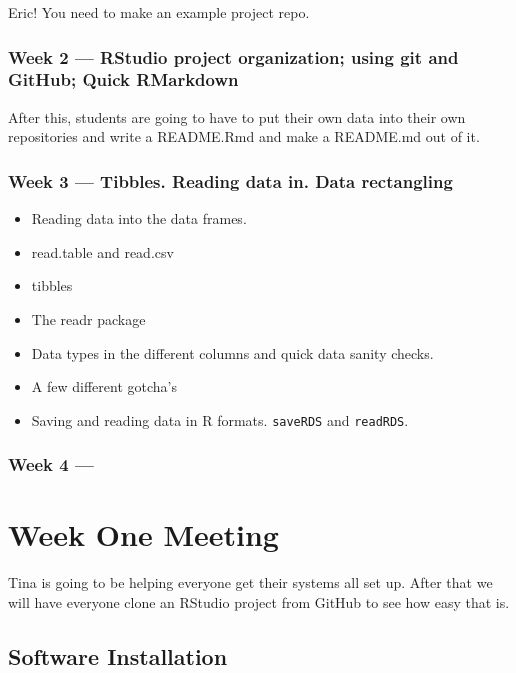 \documentclass[]{book}
\providecommand{\tightlist}{%
  \setlength{\itemsep}{0pt}\setlength{\parskip}{0pt}}
\theoremstyle{definition}
\theoremstyle{definition}
\theoremstyle{remark}
\begin{document}
Eric! You need to make an example project repo.

\subsection{Week 2 --- RStudio project organization; using git and
GitHub; Quick
RMarkdown}\label{week-2-rstudio-project-organization-using-git-and-github-quick-rmarkdown}

After this, students are going to have to put their own data into their
own repositories and write a README.Rmd and make a README.md out of it.

\subsection{Week 3 --- Tibbles. Reading data in. Data
rectangling}\label{week-3-tibbles.-reading-data-in.-data-rectangling}

\begin{itemize}
\tightlist
\item
  Reading data into the data frames.
\item
  read.table and read.csv
\item
  tibbles
\item
  The readr package
\item
  Data types in the different columns and quick data sanity checks.
\item
  A few different gotcha's
\item
  Saving and reading data in R formats. \texttt{saveRDS} and
  \texttt{readRDS}.
\end{itemize}

\subsection{Week 4 ---}\label{week-4}

\chapter{Week One Meeting}\label{week1}

Tina is going to be helping everyone get their systems all set up. After
that we will have everyone clone an RStudio project from GitHub to see
how easy that is.

\section{Software Installation}\label{software-installation}
\end{document}

